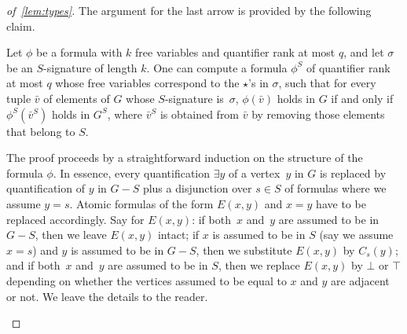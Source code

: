 \begin{proof}[of~\cref{lem:types}]
\medskip

The argument for the last arrow is provided by the following claim.

\begin{claim}\label{cl:rewrite}
  Let $\phi$ be a formula
  with $k$ free variables and quantifier rank at most $q$, 
  and let $\sigma$ be an $S$-signature of length $k$.
  One can compute a formula $\phi^S$ of quantifier rank at most $q$
  whose free variables correspond to the $\star$'s in $\sigma$,
  such that for every tuple $\bar v$ of elements of $G$
  whose $S$-signature is~$\sigma$,
   $\phi(\bar v)$ holds in $G$
  if and only if $\phi^S(\bar v^S)$ holds in $G^S$, where $\bar v^S$ is obtained from $\bar v$ by removing 
  those elements that belong to $S$.
\end{claim}
\begin{clproof}[Sketch]
The proof proceeds by a straightforward induction on the structure of the formula $\phi$.
In essence, every quantification $\exists y$ of a vertex~$y$ in $G$ is replaced by quantification of $y$ in $G-S$ plus a disjunction over $s\in S$ of formulas where we assume $y=s$.
Atomic formulas of the form $E(x,y)$ and $x=y$ have to be replaced accordingly. Say for $E(x,y)$: if both~$x$ and~$y$ are assumed to be in $G-S$, then we leave $E(x,y)$ intact;
if $x$ is assumed to be in $S$ (say we assume $x=s$) and $y$ is assumed to be in $G-S$, then we substitute $E(x,y)$ by $C_s(y)$; and if both~$x$ and~$y$ are assumed to be in $S$, then 
we replace $E(x,y)$ by $\bot$ or $\top$ depending on whether the vertices assumed to be equal to $x$ and $y$ are adjacent or not.
We leave the details to the reader.
\end{clproof}
\begin{comment}
\begin{clproof}
The proof proceeds by induction on the structure of the formula $\phi$. 

If $\phi$ is an atomic formula $E(x,x')$ or $x=x'$, then the formula $\phi^S$ is constructed by case analysis. If $\alpha(x),\alpha(x')\in Y$ then $\phi^S$
is obtained from $\phi$ by substituting the variables $x,x'$ with variables from $Y$ according to~$\alpha$. If  $\alpha(x),\alpha(x')\in S$ then $\phi'$ is the truth value $\bot$ or $\top$ of 
the formula $\phi$ in the graph $G$ under the valuation which maps $x$ to $\alpha(x)$ and $x'$ to $\alpha(x')$. 
Finally, suppose that $\alpha(x)=y\in Y$ and $\alpha(x')=s\in S$. If $\phi$ is $E(x,x')$ then $\phi'$ is the formula $C_{s}(y)$, and if $\phi$ is $x=x'$ then $\phi'$ is the formula $\bot$.
 

\end{comment}
\end{proof}
